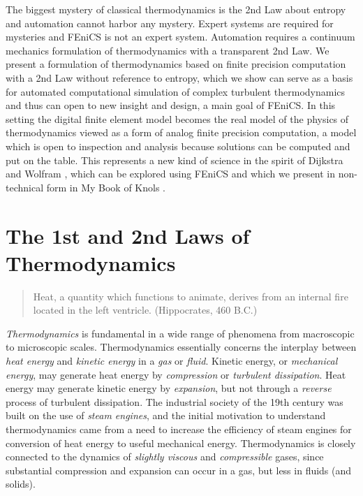 The biggest mystery of classical thermodynamics is the 2nd Law about
entropy and automation cannot harbor any mystery.  Expert systems are
required for mysteries and FEniCS is not an expert system.  Automation
requires a continuum mechanics formulation of thermodynamics with a
transparent 2nd Law.  We present a formulation of thermodynamics based
on finite precision computation with a 2nd Law without reference to
entropy, which we show can serve as a basis for automated
computational simulation of complex turbulent thermodynamics and thus
can open to new insight and design, a main goal of FEniCS. In this
setting the digital finite element model becomes the real model of the
physics of thermodynamics viewed as a form of analog finite precision
computation, a model which is open to inspection and analysis because
solutions can be computed and put on the table. This represents a new
kind of science in the spirit of Dijkstra \cite{dijkstra} and Wolfram
\cite{wolfram}, which can be explored using FEniCS and which we
present in non-technical form in My Book of Knols \cite{knol}.

\section{The 1st and 2nd Laws of Thermodynamics}

\small
\begin{quote} Heat, a quantity which functions to animate, derives
from an internal fire located in the left ventricle. (Hippocrates, 460 B.C.)
\end{quote}
\small
\normalsize

\emph{Thermodynamics} is fundamental in a wide range of phenomena from
macroscopic to microscopic scales.  Thermodynamics essentially
concerns the interplay between \emph{heat energy} and \emph{kinetic
energy} in a \emph{gas} or \emph{fluid}.  Kinetic energy, or
\emph{mechanical energy}, may generate heat energy by
\emph{compression} or \emph{turbulent dissipation}.  Heat energy may
generate kinetic energy by \emph{expansion}, but not through a
\emph{reverse} process of turbulent dissipation.  The industrial
society of the 19th century was built on the use of \emph{steam
engines}, and the initial motivation to understand thermodynamics came
from a need to increase the efficiency of steam engines for conversion
of heat energy to useful mechanical energy.  Thermodynamics is closely
connected to the dynamics of \emph{slightly viscous} and
\emph{compressible} gases, since substantial compression and expansion
can occur in a gas, but less in fluids (and solids).

